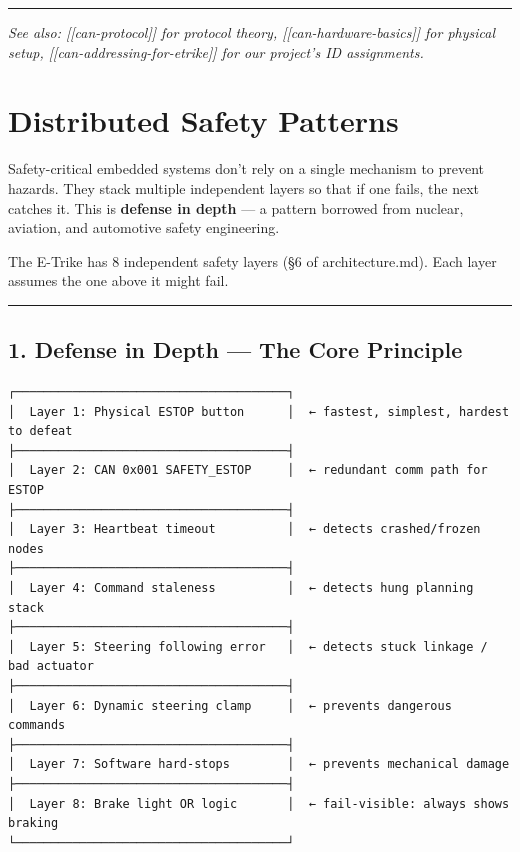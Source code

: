 \documentclass[12pt,a4paper,oneside]{report}
\begin{document}
\begin{center}\rule{0.5\linewidth}{0.5pt}\end{center}

\emph{See also: {[}{[}can-protocol{]}{]} for protocol theory,
{[}{[}can-hardware-basics{]}{]} for physical setup,
{[}{[}can-addressing-for-etrike{]}{]} for our project's ID assignments.}


\chapter{Distributed Safety Patterns}\label{distributed-safety-patterns}

Safety-critical embedded systems don't rely on a single mechanism to prevent
hazards. They stack multiple independent layers so that if one fails, the next
catches it. This is \textbf{defense in depth} --- a pattern borrowed from
nuclear, aviation, and automotive safety engineering.

The E-Trike has 8 independent safety layers (§6 of architecture.md). Each layer
assumes the one above it might fail.

\begin{center}\rule{0.5\linewidth}{0.5pt}\end{center}

\section{1. Defense in Depth --- The Core
Principle}\label{defense-in-depth-the-core-principle}

\begin{verbatim}
┌──────────────────────────────────────┐
│  Layer 1: Physical ESTOP button      │  ← fastest, simplest, hardest to defeat
├──────────────────────────────────────┤
│  Layer 2: CAN 0x001 SAFETY_ESTOP     │  ← redundant comm path for ESTOP
├──────────────────────────────────────┤
│  Layer 3: Heartbeat timeout          │  ← detects crashed/frozen nodes
├──────────────────────────────────────┤
│  Layer 4: Command staleness          │  ← detects hung planning stack
├──────────────────────────────────────┤
│  Layer 5: Steering following error   │  ← detects stuck linkage / bad actuator
├──────────────────────────────────────┤
│  Layer 6: Dynamic steering clamp     │  ← prevents dangerous commands
├──────────────────────────────────────┤
│  Layer 7: Software hard-stops        │  ← prevents mechanical damage
├──────────────────────────────────────┤
│  Layer 8: Brake light OR logic       │  ← fail-visible: always shows braking
└──────────────────────────────────────┘
\end{verbatim}
\end{document}
